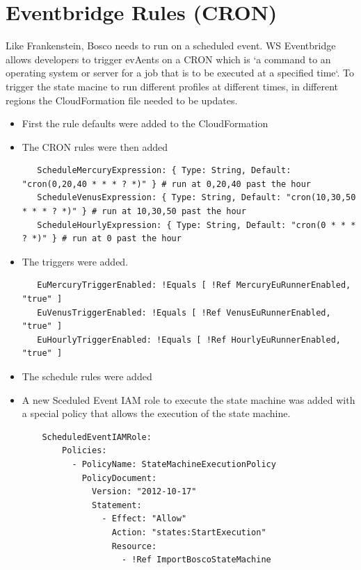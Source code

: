 \documentclass[12pt,a4paper,titlepage]{report}
\begin{document}
\section{Eventbridge Rules (CRON) }

Like Frankenstein, Bosco needs to run on a scheduled event. WS Eventbridge allows developers to trigger evAents on a CRON which is `a command to an operating system or server for a job that is to be executed at a specified time`. 
To trigger the state macine to run different profiles at different times, in different regions the  CloudFormation file needed to be updates. 
\begin{itemize}
 \item First the rule defaults were added to the  CloudFormation
 \item The CRON rules were then added 
  \begin{tcolorbox}
   \begin{verbatim}
   ScheduleMercuryExpression: { Type: String, Default: "cron(0,20,40 * * * ? *)" } # run at 0,20,40 past the hour
   ScheduleVenusExpression: { Type: String, Default: "cron(10,30,50 * * * ? *)" } # run at 10,30,50 past the hour
   ScheduleHourlyExpression: { Type: String, Default: "cron(0 * * * ? *)" } # run at 0 past the hour
   \end{verbatim}
  \end{tcolorbox}

 \item The triggers were added.
 \begin{tcolorbox}
  \begin{verbatim}
   EuMercuryTriggerEnabled: !Equals [ !Ref MercuryEuRunnerEnabled, "true" ]
   EuVenusTriggerEnabled: !Equals [ !Ref VenusEuRunnerEnabled, "true" ]
   EuHourlyTriggerEnabled: !Equals [ !Ref HourlyEuRunnerEnabled, "true" ]
  \end{verbatim}
 \end{tcolorbox}
 \item The schedule rules were added
 \item A new Sceduled Event IAM role to execute the state machine was added with a special policy that allows the execution of the state machine. 
 
 \begin{tcolorbox}
  \begin{verbatim}
    ScheduledEventIAMRole:
        Policies:
          - PolicyName: StateMachineExecutionPolicy
            PolicyDocument:
              Version: "2012-10-17"
              Statement:
                - Effect: "Allow"
                  Action: "states:StartExecution"
                  Resource:
                    - !Ref ImportBoscoStateMachine
  \end{verbatim}
 \end{tcolorbox}
\end{itemize}
\end{document}
